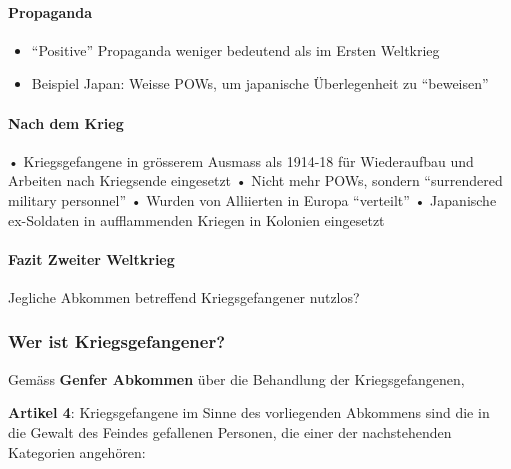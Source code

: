 {}\documentclass[a4paper]{article}
\providecommand{\tightlist}{\setlength{\itemsep}{1mm}\setlength{\parskip}{1mm}}
\begin{document}
\paragraph{Propaganda}\label{propaganda-1}

\begin{itemize}
	\tightlist
	\item
	      ``Positive'' Propaganda weniger bedeutend als im Ersten Weltkrieg
	\item
	      Beispiel Japan: Weisse POWs, um japanische Überlegenheit zu
	      ``beweisen''
\end{itemize}

\paragraph{Nach dem Krieg}\label{nach-dem-krieg}

• Kriegsgefangene in grösserem Ausmass als 1914-18 für Wiederaufbau und
Arbeiten nach Kriegsende eingesetzt • Nicht mehr POWs, sondern
``surrendered military personnel'' • Wurden von Alliierten in Europa
``verteilt'' • Japanische ex-Soldaten in aufflammenden Kriegen in
Kolonien eingesetzt

\paragraph{Fazit Zweiter Weltkrieg}\label{fazit-zweiter-weltkrieg}

Jegliche Abkommen betreffend Kriegsgefangener nutzlos?

\subsubsection{Wer ist
	Kriegsgefangener?}\label{wer-ist-kriegsgefangener}

Gemäss \textbf{Genfer Abkommen} über die Behandlung der
Kriegsgefangenen,

\textbf{Artikel 4}: Kriegsgefangene im Sinne des vorliegenden Abkommens
sind die in die Gewalt des Feindes gefallenen Personen, die einer der
nachstehenden Kategorien angehören:
\end{document}
